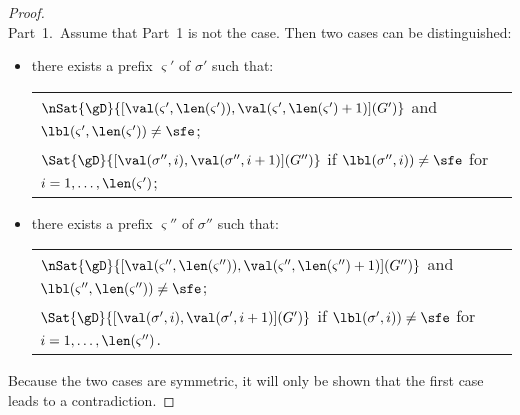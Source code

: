 \documentclass[runningheads]{llncs}
\begin{document}
\begin{proof}
\mbox{} \\
Part~1.\,
Assume that Part~1 is not the case.
Then two cases can be distinguished:
\begin{itemize}
\item
there exists a prefix $\varsigma'$ of $\sigma'$ such that:
\begin{center}
\renewcommand{\arraystretch}{1.25}
\begin{tabular}[t]{@{}l@{}}
$\nSat{\gD}
      {[\val(\varsigma',\len(\varsigma')),
        \val(\varsigma',\len(\varsigma')+1)](G')}$ and
$\lbl(\varsigma',\len(\varsigma')) \neq \sfe$;
\\
$\Sat{\gD}{[\val(\sigma'',i),\val(\sigma'',i+1)](G'')}$
if $\lbl(\sigma'',i)) \neq \sfe$ for $i = 1, \ldots, \len(\varsigma')$;
\end{tabular}
\end{center}
\item
there exists a prefix $\varsigma''$ of $\sigma''$ such that:
\begin{center}
\renewcommand{\arraystretch}{1.25}
\begin{tabular}[t]{@{}l@{}}
$\nSat{\gD}
      {[\val(\varsigma'',\len(\varsigma'')),
        \val(\varsigma'',\len(\varsigma'')+1)](G'')}$ and
$\lbl(\varsigma'',\len(\varsigma'')) \neq \sfe$;
\\ 
$\Sat{\gD}{[\val(\sigma',i),\val(\sigma',i+1)](G')}$
if $\lbl(\sigma',i)) \neq \sfe$ for $i = 1, \ldots, \len(\varsigma'')$.
\end{tabular}
\end{center}
\end{itemize}
Because the two cases are symmetric, it will only be shown that the 
first case leads to a contradiction.


\end{proof}
\end{document}
